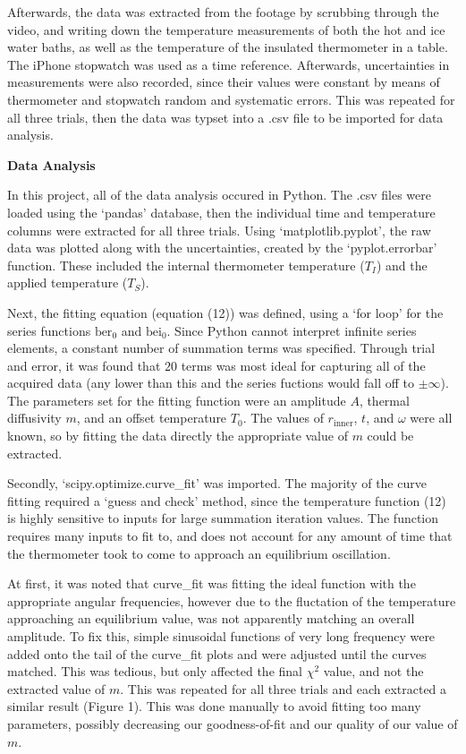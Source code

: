 \documentclass[11pt]{article}
\begin{document}
\begin{multicols}{2}
    Afterwards, the data was extracted from the footage by scrubbing through the video, and writing down the temperature measurements of both the hot and ice water baths, as well as the temperature of the insulated thermometer in a table. The iPhone stopwatch was used as a time reference. Afterwards, uncertainties in measurements were also recorded, since their values were constant by means of thermometer and stopwatch random and systematic errors. This was repeated for all three trials, then the data was typset into a .csv file to be imported for data analysis.



    \vspace{10pt}

     \selectfont \textbf{Data Analysis}
    
     \selectfont In this project, all of the data analysis occured in Python. The .csv files were loaded using the `pandas' database, then the individual time and temperature columns were extracted for all three trials. Using `matplotlib.pyplot', the raw data was plotted along with the uncertainties, created by the `pyplot.errorbar' function. These included the internal thermometer temperature ($T_I$) and the applied temperature ($T_S$). 

    Next, the fitting equation (equation (12)) was defined, using a `for loop' for the series functions $\text{ber}_0$ and $\text{bei}_0$. Since Python cannot interpret infinite series elements, a constant number of summation terms was specified. Through trial and error, it was found that $20$ terms was most ideal for capturing all of the acquired data (any lower than this and the series fuctions would fall off to $\pm\infty$). The parameters set for the fitting function were an amplitude $A$, thermal diffusivity $m$, and an offset temperature $T_0$. The values of $r_{\text{inner}}$, $t$, and $\omega$ were all known, so by fitting the data directly the appropriate value of $m$ could be extracted.   

    Secondly, `scipy.optimize.curve\_fit' was imported. The majority of the curve fitting required a `guess and check' method, since the temperature function (12) is highly sensitive to inputs for large summation iteration values. The function requires many inputs to fit to, and does not account for any amount of time that the thermometer took to come to approach an equilibrium oscillation. 

    At first, it was noted that curve\_fit was fitting the ideal function with the appropriate angular frequencies, however due to the fluctation of the temperature approaching an equilibrium value, was not apparently matching an overall amplitude. To fix this, simple sinusoidal functions of very long frequency were added onto the tail of the curve\_fit plots and were adjusted until the curves matched. This was tedious, but only affected the final $\chi^2$ value, and not the extracted value of $m$. This was repeated for all three trials and each extracted a similar result (Figure 1). This was done manually to avoid fitting too many parameters, possibly decreasing our goodness-of-fit and our quality of our value of $m$. 


\end{multicols}
\end{document}
